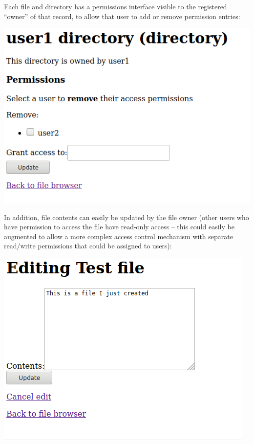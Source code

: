 \documentclass{report}
\begin{document}
Each file and directory has a permissions interface visible to the registered ``owner'' of that record, to allow that user to add or remove permission entries:

\begin{center}
  \includegraphics[scale=0.5]{06-browser2-perms.png}
\end{center}

In addition, file contents can easily be updated by the file owner (other users who have permission to access the file have read-only access -- this could easily be augmented to allow a more complex access control mechanism with separate read/write permissions that could be assigned to users):

\begin{center}
  \includegraphics[scale=0.5]{07-browser3-file-contents.png}
\end{center}
\end{document}
